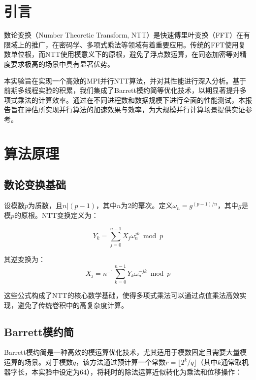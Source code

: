 \documentclass[a4paper]{article}
\begin{document}
\renewcommand {\thefigure}{\thesection{}.\arabic{figure}}%
\renewcommand{\figurename}{图}
\renewcommand{\contentsname}{目录}  


\clearpage
\tableofcontents
\newpage

\section{引言}

数论变换（Number Theoretic Transform, NTT）是快速傅里叶变换（FFT）在有限域上的推广，在密码学、多项式乘法等领域有着重要应用。传统的FFT使用复数单位根，而NTT使用模意义下的原根，避免了浮点数运算，在同态加密等对精度要求极高的场景中具有显著优势。

本实验旨在实现一个高效的MPI并行NTT算法，并对其性能进行深入分析。基于前期多线程实验的积累，我们集成了Barrett模约简等优化技术，以期显著提升多项式乘法的计算效率。通过在不同进程数和数据规模下进行全面的性能测试，本报告旨在评估所实现并行算法的加速效果与效率，为大规模并行计算场景提供实证参考。

\section{算法原理}

\subsection{数论变换基础}

设模数$p$为质数，且$n|(p-1)$，其中$n$为2的幂次。定义$\omega_n = g^{(p-1)/n}$，其中$g$是模$p$的原根。NTT变换定义为：

$$Y_k = \sum_{j=0}^{n-1} X_j \omega_n^{jk} \bmod p$$

其逆变换为：
$$X_j = n^{-1} \sum_{k=0}^{n-1} Y_k \omega_n^{-jk} \bmod p$$

这些公式构成了NTT的核心数学基础，使得多项式乘法可以通过点值乘法高效实现，避免了传统卷积中的高复杂度计算。

\subsection{Barrett模约简}

Barrett模约简是一种高效的模运算优化技术，尤其适用于模数固定且需要大量模运算的场景。对于模数$q$，该方法通过预计算一个常数$r = \lfloor 2^k/q \rfloor$（其中$k$通常取机器字长，本实验中设定为64），将耗时的除法运算近似转化为乘法和位移操作：
\end{document}
